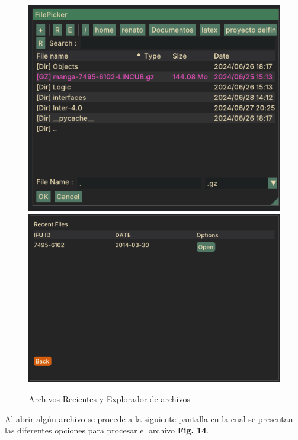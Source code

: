 \documentclass[9pt,twocolumn,a4paper]{opticajnl}
\begin{document}
\begin{figure}
    \centering
    \includegraphics[width=1\linewidth]{file_explorer_visor.png}
    \includegraphics[width=1\linewidth]{recent_files.png}
    \caption{Archivos Recientes y Explorador de archivos}
    \label{fig:recent_files}
\end{figure}

Al abrir algún archivo se procede a la siguiente pantalla en la cual se presentan las diferentes opciones para procesar el archivo \textbf{Fig. 14}.
\end{document}
